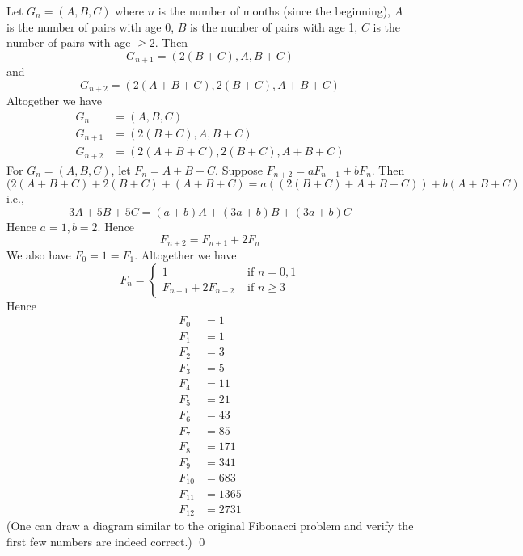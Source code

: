 Let $G_n = (A, B, C)$ where $n$ is the number of months (since the
beginning), $A$ is the number of pairs with age 0,
$B$ is the number of pairs with age 1,
$C$ is the number of pairs with age $\geq 2$.
Then
\[
G_{n+1} = (2(B + C), A, B + C)
\]
and
\[
G_{n+2} = (2(A + B + C), 2(B + C), A + B + C)
\]
Altogether we have
\begin{align*}
  G_n &= (A, B, C) \\
  G_{n+1} &= (2(B + C), A, B + C) \\
  G_{n+2} &= (2(A + B + C), 2(B + C), A + B + C)
\end{align*}
For $G_n = (A, B, C)$, let $F_n = A + B + C$.
Suppose $F_{n + 2} = aF_{n+1} + b F_n$. 
Then
\[
(2(A + B + C) + 2(B + C) + (A + B + C)
= a ((2(B + C) + A + B + C)) + b (A + B + C)
\]
i.e.,
\[
3A + 5B + 5C
= (a + b)A + (3a + b)B + (3a + b)C
\]
Hence $a = 1, b = 2$.
Hence
\[
F_{n + 2} = F_{n+1} + 2F_n
\]
We also have $F_0 = 1 = F_1$.
Altogether we have
\[
F_n =
\begin{cases}
  1 & \text{ if } n = 0, 1 \\
  F_{n - 1} + 2F_{n - 2} & \text{ if } n \geq 3
\end{cases}
\]
Hence
 \begin{align*}
   F_0 &= 1 \\
   F_1 &= 1 \\
   F_2 &= 3 \\
   F_3 &= 5 \\
   F_4 &= 11 \\
   F_5 &= 21 \\
   F_6 &= 43 \\
   F_7 &= 85 \\
      F_8 &= 171 \\
   F_9 &= 341 \\
   F_{10} &= 683 \\
   F_{11} &= 1365 \\
   F_{12} &= 2731
 \end{align*}
(One can draw a diagram similar to the original Fibonacci problem
and verify the first few numbers are indeed correct.)
\qed

